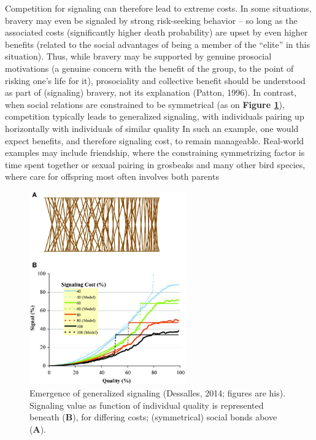 \documentclass[a4paper,12pt]{report}
\begin{document}
Competition for signaling can therefore lead to extreme costs. In some situations,
bravery may even be signaled by strong risk-seeking behavior – so long as the associated costs (significantly higher death probability) are upset by even higher benefits (related to the social advantages of being a member of the “elite” in this situation). Thus, while bravery may be supported by genuine prosocial motivations (a genuine concern with the benefit of the group, to the point of risking one’s life for it), prosociality and collective benefit should be understood as part of (signaling) bravery, not its explanation (Patton, 1996).
In contrast, when social relations are constrained to be symmetrical
(as on \textbf{Figure \ref{fig:sym_signal}}),
competition typically leads to generalized signaling, with individuals pairing
up horizontally with individuals of similar quality %
In such an example, one would expect benefits, and therefore signaling cost,
to remain manageable. Real-world examples may include friendship, where the
constraining symmetrizing factor is time spent together %
or sexual pairing in grosbeaks and many other bird species, where care for
offspring most often involves both parents %

\begin{figure}[h]
    \centering
    \includegraphics[width=0.6\textwidth]{Sym_sgl_JLD}
    \caption{Emergence of generalized signaling (Dessalles, 2014; figures are his).
    Signaling value as function of individual quality is represented beneath (\textbf{B}),
    for differing costs; (symmetrical) social bonds above (\textbf{A}). }
    \label{fig:sym_signal}
    \end{figure}
\end{document}
